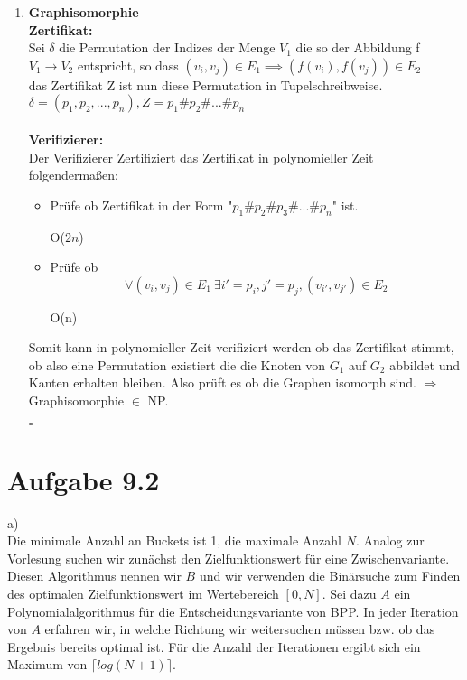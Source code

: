 \documentclass{article}
\begin{document}
\begin{enumerate}[label=(\alph*).]
		\item \textbf{Graphisomorphie}\\
		\textbf{Zertifikat:}\\
		Sei $\delta$ die Permutation der Indizes der Menge $V_1$ die so der Abbildung f $V_1 \rightarrow V_2$ entspricht, so dass $(v_i,v_j) \in E_1 \implies (f(v_i),f(v_j)) \in E_2$\\
		das Zertifikat Z ist nun diese Permutation in Tupelschreibweise. \\
		$\delta = (p_1,p_2,...,p_n), Z = p_1\#p_2\#...\#p_n$\\\\
		\textbf{Verifizierer:}\\
		Der Verifizierer Zertifiziert das Zertifikat in polynomieller Zeit folgendermaßen:
		\begin{itemize}
			\item Prüfe ob Zertifikat in der Form "$p_1\#p_2\#p_3\#...\#p_n$" ist. \begin{flushright}O($2n$)\end{flushright}
			\item Prüfe ob $$
			\forall (v_i,v_j) \in E_1\ \exists i' = p_i, j' = p_j, (v_{i'},v_{j'}) \in E_2
			$$
			\begin{flushright}O(n)\end{flushright}
		\end{itemize}
		Somit kann in polynomieller Zeit verifiziert werden ob das Zertifikat stimmt, ob also eine Permutation existiert die die Knoten von $G_1$ auf $G_2$ abbildet und Kanten erhalten bleiben. Also prüft es ob die Graphen isomorph sind. $\Rightarrow$ Graphisomorphie $\in$ NP.
		\begin{flushright}$\square$\end{flushright}
	\end{enumerate}

\section{Aufgabe 9.2}


a)\\
Die minimale Anzahl an Buckets ist 1, die maximale Anzahl $N$. Analog zur Vorlesung suchen wir zunächst den Zielfunktionswert für eine Zwischenvariante. Diesen Algorithmus nennen wir $B$ und wir verwenden die Binärsuche zum Finden des optimalen Zielfunktionswert im Wertebereich $[0,N]$. Sei dazu $A$ ein Polynomialalgorithmus für die Entscheidungsvariante von BPP. In jeder Iteration von $A$ erfahren wir, in welche Richtung wir weitersuchen müssen bzw. ob das Ergebnis bereits optimal ist. Für die Anzahl der Iterationen ergibt sich ein Maximum von $\lceil log(N+1)\rceil$.
\end{document}
